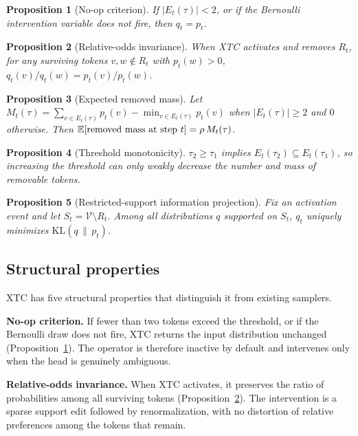 \documentclass{article}
\newcommand{\xtc}{\textsc{XTC}}
\newcommand{\Vocab}{\mathcal{V}}
\newcommand{\pt}{p_t}
\newcommand{\qt}{q_t}
\newcommand{\Et}{E_t(\tau)}
\newcommand{\Rt}{R_t}
\newcommand{\E}{\mathbb{E}}
\newtheorem{proposition}{Proposition}
\begin{document}
\begin{proposition}[No-op criterion]
\label{prop:noop}
If $|\Et| < 2$, or if the Bernoulli intervention variable does not fire, then $\qt = \pt$.
\end{proposition}

\begin{proposition}[Relative-odds invariance]
\label{prop:odds}
When \xtc{} activates and removes $\Rt$, for any surviving tokens $v,w \notin \Rt$ with $\pt(w) > 0$,
$\qt(v)/\qt(w) = \pt(v)/\pt(w)$.
\end{proposition}

\begin{proposition}[Expected removed mass]
\label{prop:mass}
Let $M_t(\tau) = \sum_{v \in \Et} \pt(v) - \min_{v \in \Et}\pt(v)$ when $|\Et| \ge 2$ and $0$ otherwise.
Then $\E[\textnormal{removed mass at step } t] = \rho \, M_t(\tau)$.
\end{proposition}

\begin{proposition}[Threshold monotonicity]
\label{prop:threshold}
$\tau_2 \ge \tau_1$ implies $E_t(\tau_2) \subseteq E_t(\tau_1)$, so increasing the threshold can only weakly decrease the number and mass of removable tokens.
\end{proposition}

\begin{proposition}[Restricted-support information projection]
\label{prop:iprojection}
Fix an activation event and let $S_t = \Vocab \setminus \Rt$.
Among all distributions $q$ supported on $S_t$, $\qt$ uniquely minimizes $\mathrm{KL}(q \,\|\, \pt)$.
\end{proposition}

\subsection{Structural properties}
\label{app:properties}

\xtc{} has five structural properties that distinguish it from existing samplers.

\textbf{No-op criterion.}
If fewer than two tokens exceed the threshold, or if the Bernoulli draw does not fire, \xtc{} returns the input distribution unchanged (Proposition~\ref{prop:noop}).
The operator is therefore inactive by default and intervenes only when the head is genuinely ambiguous.

\textbf{Relative-odds invariance.}
When \xtc{} activates, it preserves the ratio of probabilities among all surviving tokens (Proposition~\ref{prop:odds}).
The intervention is a sparse support edit followed by renormalization, with no distortion of relative preferences among the tokens that remain.
\end{document}
